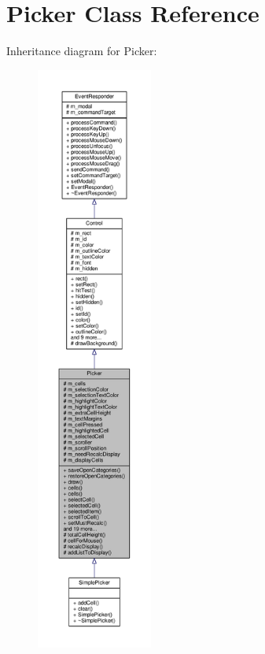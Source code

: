 \hypertarget{classPicker}{}\section{Picker Class Reference}
\label{classPicker}


Inheritance diagram for Picker\+:
\nopagebreak
\begin{figure}[H]
\begin{center}
\leavevmode
\includegraphics[height=550pt]{da/d26/classPicker__inherit__graph}
\end{center}
\end{figure}



